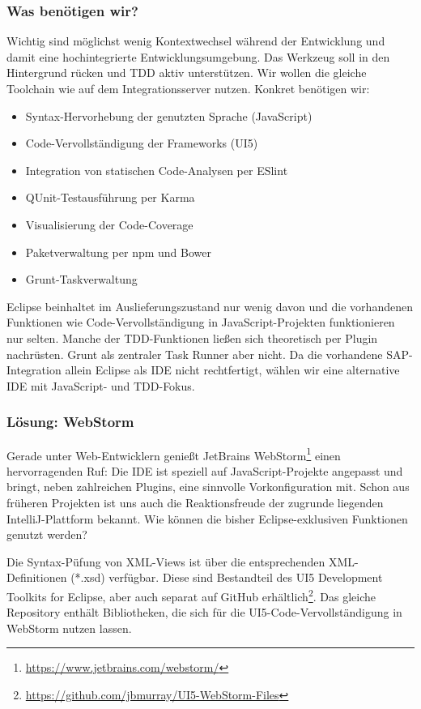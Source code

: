 \subsubsection{Was benötigen wir?}
Wichtig sind möglichst wenig Kontextwechsel während der Entwicklung und damit eine hochintegrierte Entwicklungsumgebung. Das Werkzeug soll in den Hintergrund rücken und \ac{TDD} aktiv unterstützen. Wir wollen die gleiche Toolchain wie auf dem Integrationsserver nutzen.
Konkret benötigen wir:
\begin{itemize}
	\item Syntax-Hervorhebung der genutzten Sprache (JavaScript)
	\item Code-Vervollständigung der Frameworks (UI5)
	\item Integration von statischen Code-Analysen per ESlint
	\item QUnit-Testausführung per Karma
	\item Visualisierung der Code-Coverage
	\item Paketverwaltung per npm und Bower
	\item Grunt-Taskverwaltung
\end{itemize}
Eclipse beinhaltet im Auslieferungszustand nur wenig davon und die vorhandenen Funktionen wie Code-Vervollständigung in JavaScript-Projekten funktionieren nur selten. Manche der TDD-Funktionen ließen sich theoretisch per Plugin nachrüsten. Grunt als zentraler Task Runner aber \zB nicht. Da die vorhandene SAP-Integration allein Eclipse als IDE nicht rechtfertigt, wählen wir eine alternative IDE mit JavaScript- und TDD-Fokus.

\subsubsection{Lösung: WebStorm}
Gerade unter Web-Entwicklern genießt JetBrains WebStorm\footnote{\url{https://www.jetbrains.com/webstorm/}} einen hervorragenden Ruf: Die IDE ist speziell auf JavaScript-Projekte angepasst und bringt, neben zahlreichen Plugins, eine sinnvolle Vorkonfiguration mit. Schon aus früheren Projekten ist uns auch die Reaktionsfreude der zugrunde liegenden IntelliJ-Plattform bekannt. Wie können die bisher Eclipse-exklusiven Funktionen genutzt werden?

Die Syntax-Püfung von XML-Views ist über die entsprechenden XML-Definitionen (*.xsd) verfügbar. Diese sind Bestandteil des UI5 Development Toolkits for Eclipse, aber auch separat auf GitHub erhältlich\footnote{\url{https://github.com/jbmurray/UI5-WebStorm-Files}}. Das gleiche Repository enthält Bibliotheken, die sich für die UI5-Code-Vervollständigung in WebStorm nutzen lassen.

